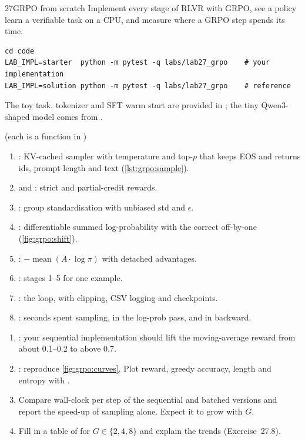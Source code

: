 \begin{labbox}{27}{GRPO from scratch}
Implement every stage of RLVR with GRPO, see a policy learn a verifiable task on a CPU, and
measure where a GRPO step spends its time.

\begin{lstlisting}[style=shell]
cd code
LAB_IMPL=starter  python -m pytest -q labs/lab27_grpo    # your implementation
LAB_IMPL=solution python -m pytest -q labs/lab27_grpo    # reference
\end{lstlisting}
The toy task, tokenizer and SFT warm start are provided in ; the tiny
Qwen3-shaped model comes from .

 (each is a function in )
\begin{enumerate}
\item {}: KV-cached sampler with temperature and top-$p$ that keeps EOS and returns
ids, prompt length and text (\cref{lst:grpo:sample}).
\item {} and : strict and partial-credit rewards.
\item {}: group standardisation with unbiased std and $\epsilon$.
\item {}: differentiable summed log-probability with the correct
off-by-one (\cref{fig:grpo:shift}).
\item {}: $-\operatorname{mean}(A\cdot\log\pi)$ with detached advantages.
\item {}: stages 1--5 for one example.
\item {}: the loop, with clipping, CSV logging and checkpoints.
\item {}: seconds spent sampling, in the log-prob pass, and in backward.
\end{enumerate}

\begin{enumerate}
\item {}: your
sequential implementation should lift the moving-average reward from about 0.1--0.2 to above 0.7.
\item {}: reproduce \cref{fig:grpo:curves}. Plot
reward, greedy accuracy, length and entropy with .
\item Compare wall-clock per step of the sequential and batched versions and report the
speed-up of sampling alone. Expect it to grow with $G$.
\item Fill in a table of  for $G\in\{2,4,8\}$ and explain the
trends (Exercise~27.8).
\end{enumerate}


\end{labbox}
